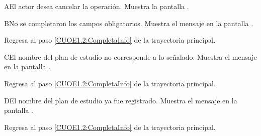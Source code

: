 \begin{UCtrayectoriaA}{A}{El actor desea cancelar la operación.}
	\UCpaso [\UCsist] Muestra la pantalla . 
\end{UCtrayectoriaA}

\begin{UCtrayectoriaA}{B}{No se completaron los campos obligatorios.}
	\UCpaso [\UCsist] Muestra el mensaje  en la pantalla .
	
	\UCpaso Regresa al paso \ref{CUOE1.2:CompletaInfo} de la trayectoria principal.
\end{UCtrayectoriaA}

\begin{UCtrayectoriaA}{C}{El nombre del plan de estudio no corresponde a lo señalado.}
	\UCpaso [\UCsist] Muestra el mensaje  en la pantalla .
	
	\UCpaso 
	Regresa al paso \ref{CUOE1.2:CompletaInfo} de la trayectoria principal.
\end{UCtrayectoriaA}

\begin{UCtrayectoriaA}{D}{El nombre del plan de estudio ya fue registrado.}
	\UCpaso [\UCsist] Muestra el mensaje  en la pantalla .
	
	\UCpaso Regresa al paso \ref{CUOE1.2:CompletaInfo} de la trayectoria principal.
\end{UCtrayectoriaA}

